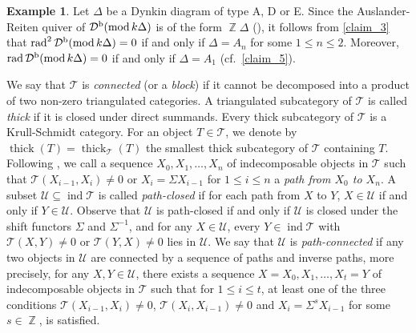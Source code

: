 \documentclass[12pt]{amsart}
\numberwithin{equation}{subsection}
\theoremstyle{plain}
\theoremstyle{definition}
\newtheorem{example}[theorem]{Example}
\newcommand{\rad}{\operatorname{rad}}
\renewcommand{\mod}{\mathrm{mod}\,}
\newcommand{\ind}{\operatorname{ind}}
\newcommand{\thick}{\operatorname{thick}}
\newcommand{\Z}{\operatorname{\mathbb{Z}}\nolimits}
\newcommand{\T}{\mathcal{T}}
\newcommand{\U}{\mathcal{U}}
\newcommand{\D}{\mathcal{D}}
\begin{document}
\begin{example}
Let $\Delta$ be a Dynkin diagram of type A, D or E. 
Since the Auslander-Reiten quiver of $\D^{\rm b}(\mod k\Delta)$ is of the form $\Z\Delta$ (\cite[I.5.5]{Happel_book}), it follows from \cref{claim_3} that $\rad^2\D^{\rm b}(\mod k\Delta)=0$ if and only if $\Delta
=A_n$ for some $1\leq n \leq 2$.
Moreover, $\rad\D^{\rm b}(\mod k\Delta)=0$ if and only if $\Delta=A_1$ (cf.~\cref{claim_5}).
\end{example}







We say that $\T$ is {\it connected} (or a {\it block}) if it cannot be decomposed into a product of two non-zero triangulated categories. 
A triangulated subcategory of $\T$ is called {\it thick} if it is closed under direct summands.
Every thick subcategory of $\T$ is a Krull-Schmidt category.
For an object $T \in \T$, we denote by $\thick(T)=\thick_\T(T)$ the smallest thick subcategory of $\T$ containing $T$.
Following \cite[4.1]{Chen-Ringel_2018}, we call a sequence $X_0, X_1, \ldots,  X_n$ of indecomposable objects in $\T$ such that $\T(X_{i-1},X_i) \neq 0$ or $X_i = \Sigma X_{i-1}$ for $1 \leq i \leq n$ a {\it path from $X_0$ to $X_n$}.
A subset $\U \subseteq \ind\T$ is called {\it path-closed} if for each path from $X$ to $Y$, $X\in\U$ if and only if $Y\in\U$.
Observe that $\U$ is path-closed if and only if $\U$ is closed under the shift functors $\Sigma$ and $\Sigma^{-1}$, and for any $X\in\U$, every $Y\in\ind\T$ with $\T(X, Y)\neq 0$ or $\T(Y, X)\neq 0$ lies in $\U$.
We say that $\U$ is {\it path-connected} if any two objects in $\U$ are connected by a sequence of paths and inverse paths, more precisely, for any $X, Y\in\U$, there exists a sequence $X = X_0, X_1, \ldots, X_t = Y$ of indecomposable objects in $\T$ such that for $1 \leq i \leq t$, at least one of the three conditions $\T(X_{i-1}, X_i)\neq 0$, $\T(X_i, X_{i-1})\neq 0$ and $X_i = \Sigma^sX_{i-1}$ for some $s \in \Z$, is satisfied.
\end{document}
